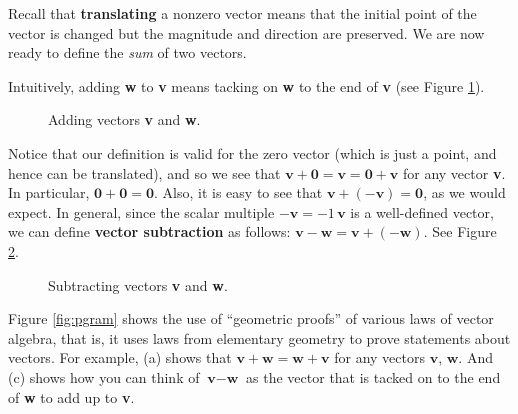 Recall that \textbf{translating} a nonzero vector means that the initial point of the vector
is changed but the magnitude and direction are preserved. We are now ready to define
the \emph{sum} of two vectors.


Intuitively, adding \textbf{w} to \textbf{v} means tacking on \textbf{w} to the end of \textbf{v} (see Figure
\ref{fig:sum}).

\begin{figure}[h]
 \centering
 \qquad
 \qquad
 \caption[]{\quad Adding vectors \textbf{v} and \textbf{w}.}
 \label{fig:sum}
\end{figure}

Notice that our definition is valid for the zero vector (which is just a point, and hence can be translated), and
so we see that $\textbf{v} + \textbf{0} = \textbf{v} = \textbf{0} + \textbf{v}$ for any vector \textbf{v}. In
particular, $\textbf{0} + \textbf{0} = \textbf{0}$. Also, it is easy to see that $\textbf{v} + (-\textbf{v}) =
\textbf{0}$, as we would expect. In general, since the scalar multiple $-\textbf{v} = -1 \,\textbf{v}$ is a
well-defined vector, we can define \textbf{vector subtraction} as follows:
$\textbf{v} - \textbf{w} = \textbf{v} + (-\textbf{w})$. See Figure \ref{fig:subtract}.

\begin{figure}[h]
 \centering
 \qquad
 \qquad
 \caption[]{\quad Subtracting vectors \textbf{v} and \textbf{w}.}
 \label{fig:subtract}
\end{figure}

Figure \ref{fig:pgram} shows the use of ``geometric proofs'' of various laws of vector algebra, that is, it
uses laws from elementary geometry to prove statements about vectors.
For example, (a) shows that $\textbf{v} + \textbf{w} = \textbf{w} + \textbf{v}$ for any vectors $\textbf{v}$,
$\textbf{w}$. And (c) shows how you can think of $\textbf{v} - \textbf{w}$ as the vector that is tacked on to the end of
\textbf{w} to add up to \textbf{v}.

